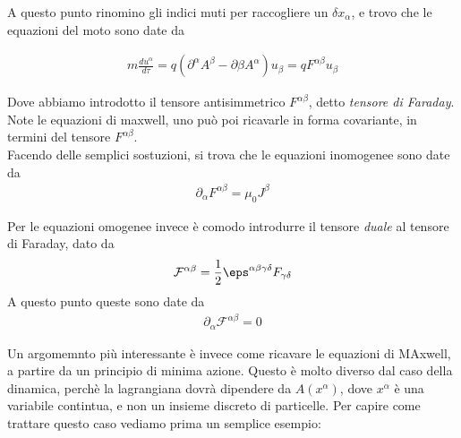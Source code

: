 \documentclass{report}
\begin{document}
A questo punto rinomino gli indici muti per raccogliere un \(\delta x_\alpha\), e trovo che le equazioni del moto sono date da 


\begin{align}
    m \frac{d u^\alpha}{d\tau} = q(\partial^\alpha A^\beta - \partial \beta A^\alpha)u_\beta = q F^{\alpha  \beta}u_\beta
\end{align}

Dove abbiamo introdotto il tensore antisimmetrico \(F^{\alpha \beta}\), detto \emph{tensore di Faraday}. \\

Note le equazioni di maxwell, uno può poi ricavarle in forma covariante, in termini del tensore \(F^{\alpha \beta}\). \\
Facendo delle semplici sostuzioni, si trova che le equazioni inomogenee sono date da 
\begin{align}
    \partial _\alpha F^{\alpha \beta} = \mu_0 J^\beta
\end{align}

Per le equazioni omogenee invece è comodo introdurre il tensore \emph{duale} al tensore di Faraday, dato da
\begin{align}
    \mathcal{F}^{\alpha \beta} = \frac{1}{2}\eps^{\alpha \beta \gamma \delta}F_{\gamma \delta}
\end{align}
A questo punto queste sono date da
\begin{align}
    \partial_\alpha \mathcal{F}^{\alpha \beta}=0
\end{align}

Un argomemnto più interessante è invece come ricavare le equazioni di MAxwell, a partire da un principio di minima azione. Questo è molto diverso dal caso della dinamica, perchè la lagrangiana dovrà dipendere da \(A(x^\alpha)\), dove \(x^\alpha\) è una variabile contintua, e non un insieme discreto di particelle. Per capire come trattare questo caso vediamo prima un semplice esempio: 
\end{document}
